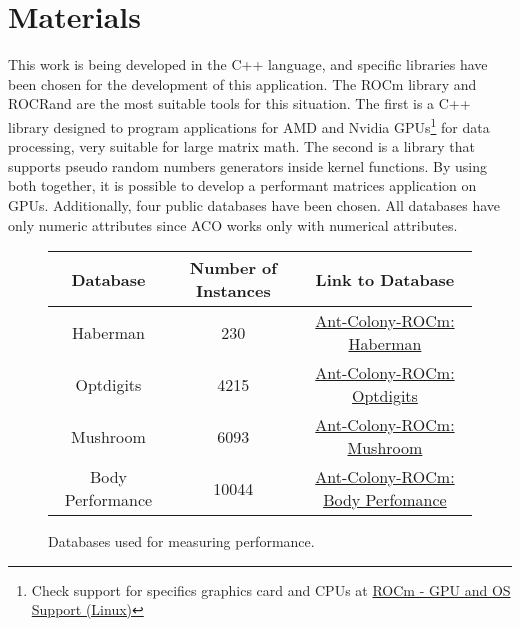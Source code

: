 \section{Materials} \label{Materials}

This work is being developed in the C++ language, and specific libraries have been chosen for the development of this application. The ROCm library\cite{rocm} and ROCRand\cite{rocrand} are the most suitable tools for this situation.
The first is a C++ library designed to program applications for AMD and Nvidia GPUs\footnote[1]{Check support for specifics graphics card and CPUs at \href{https://rocm.docs.amd.com/en/latest/release/gpu_os_support.html}{ROCm - GPU and OS Support (Linux)}} for data processing, very suitable for large matrix math.
The second is a library that supports pseudo random numbers generators inside kernel functions. By using both together, it is possible to develop a performant matrices application on GPUs.
Additionally, four public databases have been chosen. All databases have only numeric attributes since ACO works only with numerical attributes.

\begin{figure}
    \begin{center}
        \begin{tabular}{|c|c|c|}
            \hline
            Database & Number of Instances & Link to Database \\
            \hline
            Haberman & 230 & \href{https://raw.githubusercontent.com/LucasSnatiago/Ant-Colony-ROCm/main/database/haberman_treino_normal.csv}{Ant-Colony-ROCm: Haberman} \\
            Optdigits & 4215 & \href{https://raw.githubusercontent.com/LucasSnatiago/Ant-Colony-ROCm/main/database/optdigits_treino_normal.csv}{Ant-Colony-ROCm: Optdigits} \\
            Mushroom & 6093 & \href{https://raw.githubusercontent.com/LucasSnatiago/Ant-Colony-ROCm/main/database/mushrooms_treino_normal.csv}{Ant-Colony-ROCm: Mushroom} \\
            Body Performance & 10044 & \href{https://raw.githubusercontent.com/LucasSnatiago/Ant-Colony-ROCm/main/database/body_performance_treino_normal.csv}{Ant-Colony-ROCm: Body Perfomance} \\
            \hline
        \end{tabular}
        \caption{Databases used for measuring performance.}
    \end{center}
    \label{fig:datasets}
\end{figure}

